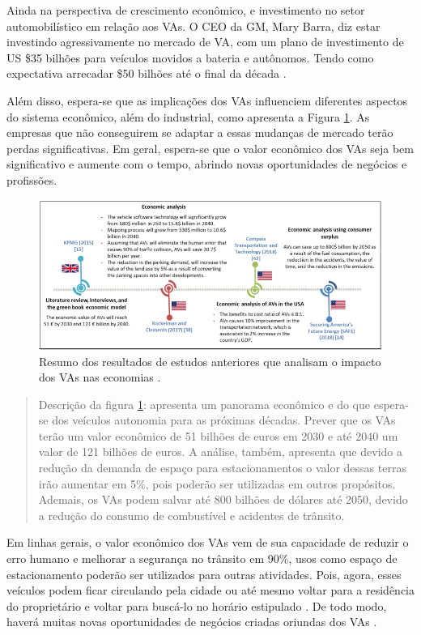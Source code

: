 Ainda na perspectiva de crescimento econômico, e investimento no setor automobilístico em relação aos VAs. O CEO da GM, Mary Barra, diz estar investindo agressivamente no mercado de VA, com um plano de investimento de US \$35 bilhões para veículos movidos a bateria e autônomos. Tendo como expectativa arrecadar \$50 bilhões até o final da década \cite{gm}.

Além disso, espera-se que as implicações dos VAs influenciem diferentes aspectos do sistema econômico, além do industrial, como apresenta a Figura \ref{figura_resumo}. As empresas que não conseguirem se adaptar a essas mudanças 
 de mercado terão perdas significativas. Em geral, espera-se que o valor econômico dos VAs seja bem significativo e aumente com o tempo, abrindo novas oportunidades de negócios e profissões.

\begin{figure}[H]
\centering
\includegraphics[width=\textwidth]{Figures/vas-mercado.png}
\caption{Resumo dos resultados de estudos anteriores que analisam o impacto dos VAs nas economias \cite{mundobrasil}.}
\label{figura_resumo}
\end{figure}

\begin{quote}
Descrição da figura \ref{figura_resumo}: apresenta um panorama econômico e do que espera-se dos veículos autonomia para as próximas décadas. Prever que os VAs terão um valor econômico de 51 bilhões de euros em 2030 e até 2040 um valor de 121 bilhões de euros. A análise, também, apresenta que devido a redução da demanda de espaço para estacionamentos o valor dessas terras irão aumentar em 5\%, pois poderão ser utilizadas em outros propósitos. Ademais, os VAs podem salvar até 800 bilhões de dólares até 2050, devido a redução do consumo de combustível e acidentes de trânsito. 
\end{quote}

Em linhas gerais, o valor econômico dos VAs vem de sua capacidade de reduzir o erro humano e melhorar a segurança no trânsito em 90\%, usos como espaço de estacionamento poderão ser utilizados para outras atividades. Pois, agora, esses veículos podem ficar circulando pela cidade ou até mesmo voltar para a residência do proprietário e voltar para buscá-lo no horário estipulado \cite{4cenarios_ocidental}. De todo modo, haverá muitas novas oportunidades de negócios criadas oriundas dos VAs \cite{mundobrasil}.




